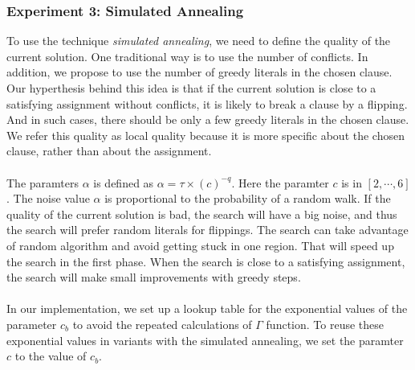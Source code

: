 \documentclass[12pt,a4paper,twoside]{scrartcl}
\numberwithin{equation}{section}
\begin{document}
\subsubsection{Experiment 3: Simulated Annealing} 
\label{sec:Experiment 3}
To use the technique \emph{simulated annealing}, we need to define the quality of the current solution.  One traditional way is to use the number of conflicts. In addition, we propose to use the number of greedy literals in the chosen clause. Our hyperthesis behind this idea is that if the current solution is close to a satisfying assignment without conflicts, it is likely to break a clause by a flipping.  And in such cases, there should be only a few greedy literals in the chosen clause.  We refer this quality as local quality because it is more specific about the chosen clause, rather than about the assignment. \\
\\
The paramters $\alpha$ is defined as $\alpha = \tau \times (c)^{-q}$. Here the paramter $c$ is in $[2,\cdots,6]$. The noise value $\alpha$ is proportional to the probability of a random walk. If the quality of the current solution is bad, the search will have a big noise, and thus the search will prefer random literals for flippings. The search can take advantage of random algorithm and avoid getting stuck in one region. That will speed up the search in the first phase. When the search is close to a satisfying assignment, the search will make small improvements with greedy steps.\\
\\
In our implementation, we set up a lookup table for the exponential values of the parameter $c_b$ to avoid  the repeated calculations of $\Gamma$ function. To reuse these exponential values in variants with the simulated annealing, we set the paramter $c$ to the value of   $c_b$. \\
\\
\end{document}
